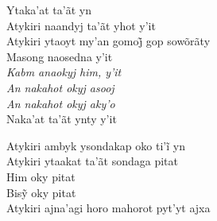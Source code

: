 \bigskip

\begin{linenumbers}\begingroup\raggedright
 
\noindent   Ytaka'at ta'ãt yn\\
  Atykiri naandyj ta'ãt yhot y'it\\
  Atykiri ytaoyt my’an gomoj̃ gop sowõrãty\\
  Masong naosedna y'it\\
  \textit{Kabm anaokyj him, y'it}\\
  \textit{An nakahot okyj asooj}\\
  \textit{An nakahot okyj aky'o}\\
  Naka'at ta'ãt ynty y'it
 
\end{linenumbers}\endgroup

\bigskip

\begin{linenumbers}\begingroup\raggedright
 
\noindent   Atykiri ambyk ysondakap oko ti’ĩ yn\\
  Atykiri ytaakat ta'ãt sondaga pitat\\
  Him oky pitat\\
  Bisỹ oky pitat\\
  Atykiri ajna'agi horo mahorot pyt'yt ajxa
 
\end{linenumbers}\endgroup

\bigskip

